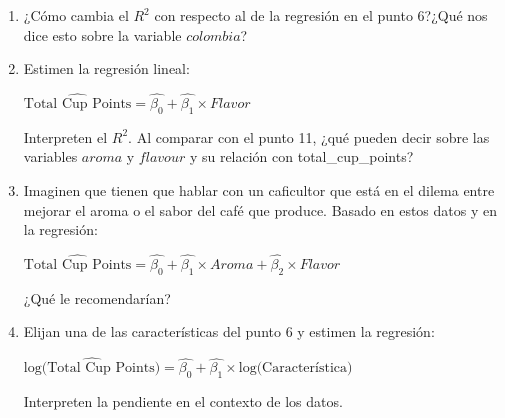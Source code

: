\documentclass[letterpaper]{article}
\begin{document}
\begin{enumerate}
 \item ¿Cómo cambia el $R^2$ con respecto al de la regresión en el punto 6?¿Qué nos dice esto sobre la variable $colombia$?
 
 
 \item Estimen la regresión lineal:
 
 $\widehat{\text{Total Cup Points}}=\hat{\beta_0}+\hat{\beta_1}\times Flavor$
 
 Interpreten el $R^2$. Al comparar con el punto 11, ¿qué pueden decir sobre las variables $aroma$ y $flavour$ y su relación con total\_cup\_points?
 
 \item Imaginen que tienen que hablar con un caficultor que está en el dilema entre mejorar el aroma o el sabor del café que produce. Basado en estos datos y en la regresión:
 
  $\widehat{\text{Total Cup Points}}=\hat{\beta_0}+\hat{\beta_1}\times Aroma + \hat{\beta_2}\times Flavor$
  
  ¿Qué le recomendarían?
  
 \item Elijan una de las características del punto 6 y estimen la regresión:
  
  $\widehat{\text{log(Total Cup Points)}}=\hat{\beta_0}+\hat{\beta_1}\times \text{log(Característica)}$
  
  Interpreten la pendiente en el contexto de los datos. 
  
  
\end{enumerate}
\end{document}
